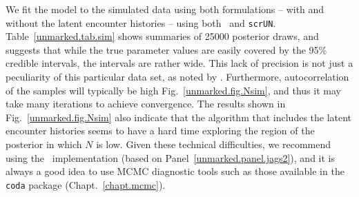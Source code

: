 We fit the model to the simulated data using both formulations -- with and without
the latent encounter histories -- using both
\jags~and \verb+scrUN+.
Table~\ref{unmarked.tab.sim} shows %
summaries of 25000 posterior draws, and suggests that while the
true parameter values are easily covered by the 95\% credible
intervals, the intervals are rather wide. %
This lack of precision is not just a
peculiarity of this particular data set,
as noted by \citet{chandler_royle:2012}. Furthermore,
autocorrelation of the samples will typically be high
Fig.~\ref{unmarked.fig.Nsim},
and thus it may take many iterations to achieve convergence.
The results shown in Fig.~\ref{unmarked.fig.Nsim} also indicate that
the algorithm that includes the latent encounter histories
seems to have a hard time exploring the region of the posterior in
which $N$ is low. Given these technical difficulties, we recommend
using the \jags~implementation (based on
Panel~\ref{unmarked.panel.jags2}), and it is always a good idea to use
MCMC diagnostic tools such as those available in the \texttt{coda}
package (Chapt.~\ref{chapt.mcmc}).


